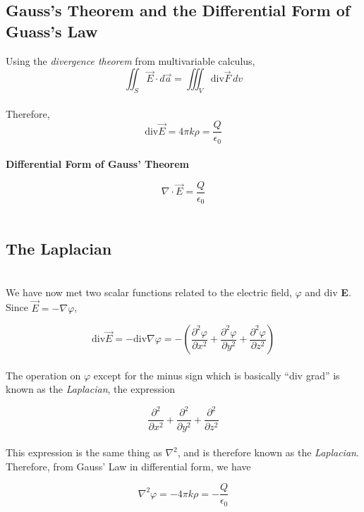 \documentclass[svgnames]{article}
\begin{document}
\subsection{Gauss's Theorem and the Differential Form of Guass's Law}

Using the \textit{divergence theorem} from multivariable calculus, \\

\[ \iint_S \vec{E} \cdot d\vec{a} = \iiint_V \text{div} \vec{F} \, dv \]\\ 

Therefore,  \\

\[ \text{div} \vec{E} = 4 \pi k \rho = \frac{Q}{\epsilon_0} \] \\

\textbf{Differential Form of Gauss' Theorem} 

\[ \nabla \cdot \vec{E} = \frac{Q}{\epsilon_0} \] \\ 

\subsection{The Laplacian} \mbox{} \\ 

We have now met two scalar functions related to the electric field, $\varphi$ and div \textbf{E}. \\

Since $\vec{E} = -\nabla \varphi$, 

\[ \text{div} \vec{E} = - \text{div} \nabla \varphi = -\left(\frac{\partial^2 \varphi}{\partial x^2} + \frac{\partial^2 \varphi}{\partial y^2} + \frac{\partial^2 \varphi}{\partial z^2}\right) \] \\

The operation on $\varphi$ except for the minus sign which is basically ``div grad'' is known as the \textit{Laplacian}, the expression 

\[ \frac{\partial^2}{\partial x^2} + \frac{\partial^2 }{\partial y^2} + \frac{\partial^2}{\partial z^2} \] \\ 

This expression is the same thing as $\nabla^2$, and is therefore known as the \textit{Laplacian}. \\

Therefore, from Gauss' Law in differential form, we have 

\[ \nabla^2 \varphi = -4\pi k \rho = -\frac{Q}{\epsilon_0} \] 
\end{document}
